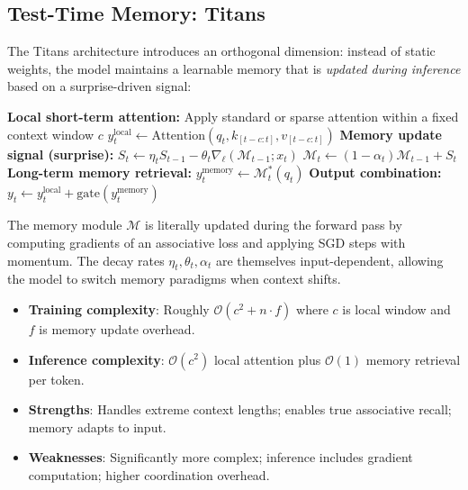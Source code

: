 \subsection{Test-Time Memory: Titans}

The Titans architecture \citep{behrouz_titans_2025} introduces an orthogonal dimension: instead of static weights, the model maintains a learnable memory that is \textit{updated during inference} based on a surprise-driven signal:

\begin{algorithmic}[1]
\State \textbf{Local short-term attention:} Apply standard or sparse attention within a fixed context window $c$
\State $y_t^{\text{local}} \gets \text{Attention}(q_t, k_{[t-c:t]}, v_{[t-c:t]})$
\State \textbf{Memory update signal (surprise):}
\State $S_t \gets \eta_t S_{t-1} - \theta_t \nabla_\ell(\mathcal{M}_{t-1}; x_t)$ 
\State $\mathcal{M}_t \gets (1 - \alpha_t) \mathcal{M}_{t-1} + S_t$ 
\State \textbf{Long-term memory retrieval:}
\State $y_t^{\text{memory}} \gets \mathcal{M}_t^* (q_t)$ 
\State \textbf{Output combination:}
\State $y_t \gets y_t^{\text{local}} + \text{gate}(y_t^{\text{memory}})$ 
\end{algorithmic}

The memory module $\mathcal{M}$ is literally updated during the forward pass by computing gradients of an associative loss and applying SGD steps with momentum. The decay rates $\eta_t, \theta_t, \alpha_t$ are themselves input-dependent, allowing the model to switch memory paradigms when context shifts.

\begin{itemize}[leftmargin=*]
    \item \textbf{Training complexity}: Roughly $\mathcal{O}(c^2 + n \cdot f)$ where $c$ is local window and $f$ is memory update overhead.
    \item \textbf{Inference complexity}: $\mathcal{O}(c^2)$ local attention plus $\mathcal{O}(1)$ memory retrieval per token.
    \item \textbf{Strengths}: Handles extreme context lengths; enables true associative recall; memory adapts to input.
    \item \textbf{Weaknesses}: Significantly more complex; inference includes gradient computation; higher coordination overhead.
\end{itemize}

